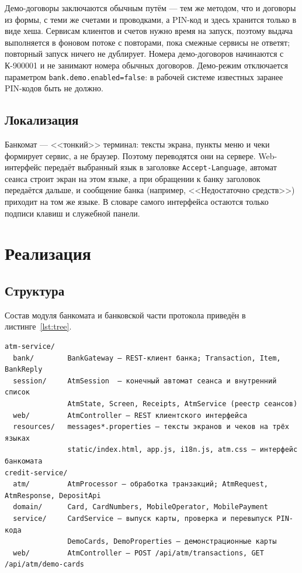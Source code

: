 \documentclass[14pt,a4paper]{extarticle}
\begin{document}
Демо-договоры заключаются обычным путём --- тем же методом, что и договоры из формы, с теми
же счетами и проводками, а PIN-код и здесь хранится только в виде хеша. Сервисам клиентов и
счетов нужно время на запуск, поэтому выдача выполняется в фоновом потоке с повторами, пока
смежные сервисы не ответят; повторный запуск ничего не дублирует. Номера демо-договоров
начинаются с К-900001 и не занимают номера обычных договоров. Демо-режим отключается
параметром \texttt{bank.demo.enabled=false}: в рабочей системе известных заранее PIN-кодов
быть не должно.

\subsection{Локализация}

Банкомат --- <<тонкий>> терминал: тексты экрана, пункты меню и чеки формирует сервис, а не
браузер. Поэтому переводятся они на сервере. Web-интерфейс передаёт выбранный язык в
заголовке \texttt{Accept-Language}, автомат сеанса строит экран на этом языке, а при
обращении к банку заголовок передаётся дальше, и сообщение банка (например, <<Недостаточно
средств>>) приходит на том же языке. В словаре самого интерфейса остаются только подписи
клавиш и служебной панели.

\section{Реализация}

\subsection{Структура}

Состав модуля банкомата и банковской части протокола приведён в листинге~\ref{lst:tree}.

\begin{Verbatim}[fontsize=\footnotesize, frame=single, rulecolor=\color{codeframe}]
atm-service/
  bank/        BankGateway — REST-клиент банка; Transaction, Item, BankReply
  session/     AtmSession  — конечный автомат сеанса и внутренний список
               AtmState, Screen, Receipts, AtmService (реестр сеансов)
  web/         AtmController — REST клиентского интерфейса
  resources/   messages*.properties — тексты экранов и чеков на трёх языках
               static/index.html, app.js, i18n.js, atm.css — интерфейс банкомата
credit-service/
  atm/         AtmProcessor — обработка транзакций; AtmRequest, AtmResponse, DepositApi
  domain/      Card, CardNumbers, MobileOperator, MobilePayment
  service/     CardService — выпуск карты, проверка и перевыпуск PIN-кода
               DemoCards, DemoProperties — демонстрационные карты
  web/         AtmController — POST /api/atm/transactions, GET /api/atm/demo-cards
\end{Verbatim}
\end{document}

